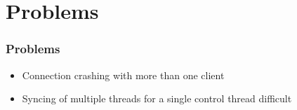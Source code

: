 \section{Problems}

\begin{frame}
\frametitle{Problems}
\begin{itemize}
	\item Connection crashing with more than one client
	\item Syncing of multiple threads for a single control thread difficult
\end{itemize}
\end{frame}


